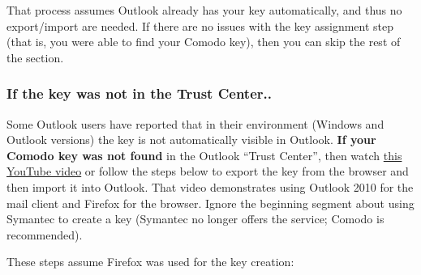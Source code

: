 \documentclass[pdftex,12pt,titlepage=false]{scrartcl}
\begin{document}
That process assumes Outlook already has your key automatically, and
thus no export/import are needed.  If there are no issues with the key
assignment step (that is, you were able to find your Comodo key), then
you can skip the rest of the section.

\subsubsection{If the key was not in the Trust Center..}
Some Outlook users have reported that in their environment (Windows
and Outlook versions) the key is not automatically visible in Outlook.
\textbf{If your Comodo key was not found} in the Outlook ``Trust
Center'', then watch
\href{https://www.youtube.com/watch?v=wGHaB0elkaA}{this YouTube video}
or follow the steps below to export the key from the browser and then
import it into Outlook.  That video demonstrates using Outlook 2010
for the mail client and Firefox for the browser.  Ignore the beginning
segment about using Symantec to create a key (Symantec no longer
offers the service; Comodo is recommended).

These steps assume Firefox was used for the key creation:
\end{document}
